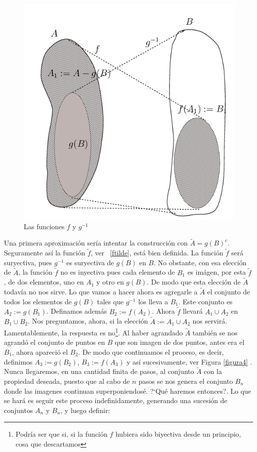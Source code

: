 \begin{figure}[h]


\begin{center}
\includegraphics[scale=.5]{imagenes/supfyg.png}
\end{center}

 \caption{Las funciones $f$ y $g^{-1}$}\label{figura3}
\end{figure}

Una primera aproximación sería intentar la construcción
con $\tilde{A}=g(B)^c$. Seguramente así la función
$\tilde{f}$, ver ~\eqref{ftilde}, está bien definida. La
función $\tilde{f}$ será suryectiva, pues $g^{-1}$ es
suryectiva de $g(B)$ en $B$. No obstante, con esa elección de
$\tilde{A}$, la función $\tilde{f}$ no es inyectiva pues cada
elemento de $B_1$ es imágen, por esta $\tilde{f}$, de dos
elementos, uno en $A_1$ y otro en $g(B)$. De modo que esta
elección de $\tilde{A}$ todavía no nos sirve. Lo que vamos
a hacer ahora es agregarle a $\tilde{A}$ el conjunto de todos los
elementos de $g(B)$ tales que $g^{-1}$ los lleva a $B_1$. Este
conjunto es $A_2:=g(B_1)$. Definamos además $B_2:=f(A_2)$. Ahora
$\tilde{f}$ llevará $A_1\cup A_2$ en $B_1\cup B_2$. Nos
preguntamos, ahora, si la elección $\tilde{A}:=A_1\cup A_2$ nos
servirá. Lamentablemente, la respuesta es
no\footnote{Podría ser que si, si la función $f$ hubiera
sido biyectiva desde un principio, cosa que descartamos}. Al haber
agrandado $\tilde{A}$ también se nos agrandó el conjunto
de puntos en $B$ que son imagen de dos puntos, antes era el $B_1$,
ahora apareció el $B_2$. De modo que continuamos el proceso,
es decir, definimos $A_3:=g(B_2)$, $B_3:=f(A_3)$ y así
sucesivamente, ver Figura \vref{figura4} . Nunca llegaremos, en
una cantidad finita de pasos, al conjunto $\tilde{A}$ con la
propiedad deseada, puesto que al cabo de $n$ pasos se nos genera
el conjunto $B_n$ donde las imagenes continuan superponiendosé.
?`Qué haremos entonces?. Lo que se hará es seguir este proceso
indefinidamente, generando una sucesión de conjuntos $A_n$ y
$B_n$, y luego definir:

